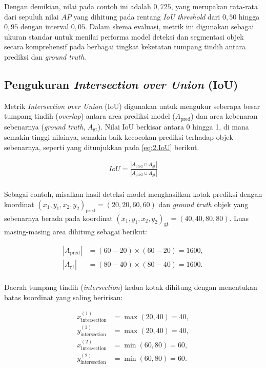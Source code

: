 Dengan demikian, nilai \APrangefifty pada contoh ini adalah $0{,}725$, yang merupakan rata-rata dari sepuluh nilai $AP$ yang dihitung pada rentang \textit{IoU threshold} dari $0{,}50$ hingga $0{,}95$ dengan interval $0{,}05$. Dalam skema evaluasi, metrik ini digunakan sebagai ukuran standar untuk menilai performa model deteksi dan segmentasi objek secara komprehensif pada berbagai tingkat keketatan tumpang tindih antara prediksi dan \textit{ground truth}.

\subsection{Pengukuran \textit{Intersection over Union} (IoU)}
Metrik \textit{Intersection over Union} (IoU) digunakan untuk mengukur seberapa besar tumpang tindih (\textit{overlap}) antara area prediksi model ($A_{\text{pred}}$) dan area kebenaran sebenarnya (\textit{ground truth}, $A_{\text{gt}}$). Nilai IoU berkisar antara 0 hingga 1, di mana semakin tinggi nilainya, semakin baik kecocokan prediksi terhadap objek sebenarnya, seperti yang ditunjukkan pada \ref{eq:2.IoU} berikut.

\medskip
\begin{align*}
    IoU = \frac{|A_{\text{pred}} \cap A_{\text{gt}}|}{|A_{\text{pred}} \cup A_{\text{gt}}|} \\[0.5em]
\end{align*}


Sebagai contoh, misalkan hasil deteksi model menghasilkan kotak prediksi dengan koordinat
$(x_1, y_1, x_2, y_2)_{\text{pred}} = (20, 20, 60, 60)$ dan \textit{ground truth} objek yang sebenarnya berada pada koordinat
$(x_1, y_1, x_2, y_2)_{\text{gt}} = (40, 40, 80, 80)$.
Luas masing-masing area dihitung sebagai berikut:

\medskip
\begin{align*}
    |A_{\text{pred}}| &= (60 - 20) \times (60 - 20) = 1600, \\
    |A_{\text{gt}}|   &= (80 - 40) \times (80 - 40) = 1600. \\[0.5em]
\end{align*}

Daerah tumpang tindih (\textit{intersection}) kedua kotak dihitung dengan menentukan batas koordinat yang saling beririsan:

\medskip
\begin{align*}
    x_{\text{intersection}}^{(1)} &= \max(20, 40) = 40, \\
    y_{\text{intersection}}^{(1)} &= \max(20, 40) = 40, \\
    x_{\text{intersection}}^{(2)} &= \min(60, 80) = 60, \\
    y_{\text{intersection}}^{(2)} &= \min(60, 80) = 60. \\[0.5em]
\end{align*}

